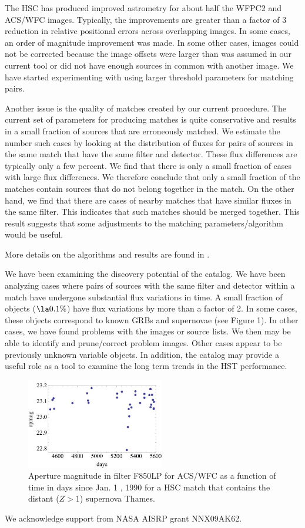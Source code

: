 The HSC has produced improved astrometry for about half the WFPC2 and ACS/WFC images. Typically, the improvements are greater than a factor of 3 reduction in relative positional errors across overlapping
images.
In some cases, an order of magnitude improvement was made.
In some other cases, images could not be corrected because
the image offsets were larger than was assumed in our current tool or did not have enough sources in common 
with another image. We have started experimenting
with using larger threshold parameters for matching pairs.

Another issue is the quality of matches created by our current procedure.
The current set of parameters for producing matches is quite conservative
and results in a small fraction of sources that are erroneously matched. We estimate the number
such cases by looking at the distribution of fluxes for pairs of sources in the same
match that have the same filter and detector. These flux differences are typically only a few
percent. We find that there is only a small
fraction of cases with large flux differences.  We therefore conclude that only a small fraction
of the matches contain sources that do not belong together in the match. On
the other hand, we find that there are cases of nearby matches that have similar
fluxes in the same filter. This indicates that such matches should be merged together.
This result suggests that some adjustments to the matching parameters/algorithm would be useful.

More details on the algorithms and results are found in \cite{2012arXiv1206.0644B}.

We have been examining the discovery potential of the catalog. 
We have been analyzing cases where pairs of sources with the same filter and detector
within a match have undergone substantial flux variations in time. A small fraction of objects ($\la 0.1 \%$)
have flux variations by more than a factor of 2. In some cases, these    objects correspond
to known GRBs and supernovae (see Figure 1).  In other cases, we have found problems with
the images or source lists. We then may be able to identify and prune/correct problem
images. Other cases appear to be previously unknown variable objects.
In addition, the catalog may provide a useful role as a tool to examine the long term trends
in the HST performance.


\begin{figure}
\centering
\includegraphics[width=6.0cm]{part8/Lubow_O21/O21_1.eps}
\caption{Aperture magnitude in filter F850LP for ACS/WFC 
as a function of time in days since Jan. 1 , 1990 for a HSC match that contains 
the distant ($Z> 1$) supernova Thames.}
\end{figure}


\acknowledgements We acknowledge support from NASA AISRP grant NNX09AK62.



